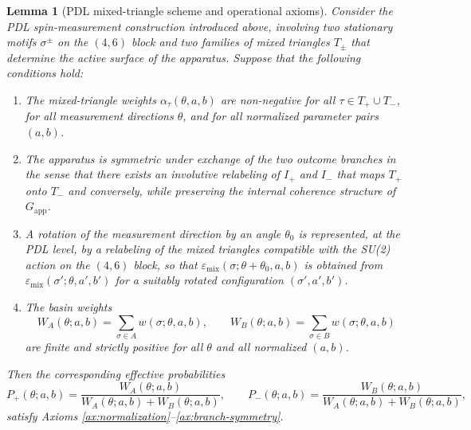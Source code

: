 \documentclass[11pt,a4paper]{article}
\numberwithin{equation}{section}
\newtheorem{lemma}[theorem]{Lemma}
\theoremstyle{definition}
\begin{document}
\begin{lemma}[PDL mixed-triangle scheme and operational axioms]
\label{lem:PDL-axioms}
Consider the PDL spin-measurement construction introduced above, involving two stationary motifs $\sigma^\pm$ on the $(4,6)$ block and two families of mixed triangles $T_\pm$ that determine the active surface of the apparatus. Suppose that the following conditions hold:
\begin{enumerate}[label=(\roman*)]
\item The mixed-triangle weights $\alpha_\tau(\theta,a,b)$ are non-negative for all $\tau\in T_+\cup T_-$, for all measurement directions $\theta$, and for all normalized parameter pairs $(a,b)$.
\item The apparatus is symmetric under exchange of the two outcome branches in the sense that there exists an involutive relabeling of $I_+$ and $I_-$ that maps $T_+$ onto $T_-$ and conversely, while preserving the internal coherence structure of $G_{\mathrm{app}}$.
\item A rotation of the measurement direction by an angle $\theta_0$ is represented, at the PDL level, by a relabeling of the mixed triangles compatible with the SU(2) action on the $(4,6)$ block, so that $\varepsilon_{\mathrm{mix}}(\sigma;\theta+\theta_0,a,b)$ is obtained from $\varepsilon_{\mathrm{mix}}(\sigma';\theta,a',b')$ for a suitably rotated configuration $(\sigma',a',b')$.
\item The basin weights
\[
W_A(\theta;a,b) = \sum_{\sigma\in A} w(\sigma;\theta,a,b),
\qquad
W_B(\theta;a,b) = \sum_{\sigma\in B} w(\sigma;\theta,a,b)
\]
are finite and strictly positive for all $\theta$ and all normalized $(a,b)$.
\end{enumerate}
Then the corresponding effective probabilities
\[
P_+(\theta;a,b)
=
\frac{W_A(\theta;a,b)}{W_A(\theta;a,b)+W_B(\theta;a,b)},\qquad
P_-(\theta;a,b)
=
\frac{W_B(\theta;a,b)}{W_A(\theta;a,b)+W_B(\theta;a,b)},
\]
satisfy Axioms
\ref{ax:normalization}--\ref{ax:branch-symmetry}.
\end{lemma}
\end{document}
